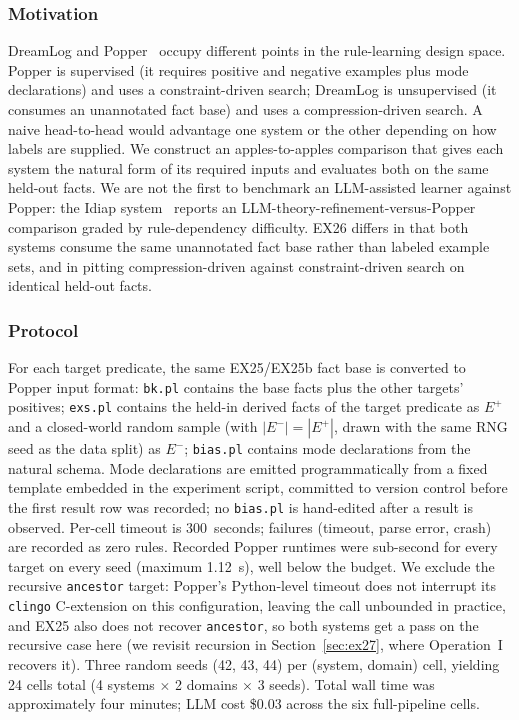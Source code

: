 \documentclass[10pt,conference]{IEEEtran}
\begin{document}
\subsubsection{Motivation}
DreamLog and Popper~\cite{cropper2021learning} occupy different points in the rule-learning design space. Popper is supervised (it requires positive and negative examples plus mode declarations) and uses a constraint-driven search; DreamLog is unsupervised (it consumes an unannotated fact base) and uses a compression-driven search. A naive head-to-head would advantage one system or the other depending on how labels are supplied. We construct an apples-to-apples comparison that gives each system the natural form of its required inputs and evaluates both on the same held-out facts. We are not the first to benchmark an LLM-assisted learner against Popper: the Idiap system~\cite{desouza2025inductive} reports an LLM-theory-refinement-versus-Popper comparison graded by rule-dependency difficulty. EX26 differs in that both systems consume the same unannotated fact base rather than labeled example sets, and in pitting compression-driven against constraint-driven search on identical held-out facts.

\subsubsection{Protocol}
For each target predicate, the same EX25/EX25b fact base is converted to Popper input format: \texttt{bk.pl} contains the base facts plus the other targets' positives; \texttt{exs.pl} contains the held-in derived facts of the target predicate as $E^+$ and a closed-world random sample (with $|E^-| = |E^+|$, drawn with the same RNG seed as the data split) as $E^-$; \texttt{bias.pl} contains mode declarations from the natural schema. Mode declarations are emitted programmatically from a fixed template embedded in the experiment script, committed to version control before the first result row was recorded; no \texttt{bias.pl} is hand-edited after a result is observed. Per-cell timeout is 300~seconds; failures (timeout, parse error, crash) are recorded as zero rules. Recorded Popper runtimes were sub-second for every target on every seed (maximum 1.12~s), well below the budget. We exclude the recursive \texttt{ancestor} target: Popper's Python-level timeout does not interrupt its \texttt{clingo} C-extension on this configuration, leaving the call unbounded in practice, and EX25 also does not recover \texttt{ancestor}, so both systems get a pass on the recursive case here (we revisit recursion in Section~\ref{sec:ex27}, where Operation~I recovers it). Three random seeds (42, 43, 44) per (system, domain) cell, yielding 24 cells total (4 systems $\times$ 2 domains $\times$ 3 seeds). Total wall time was approximately four minutes; LLM cost \$0.03 across the six full-pipeline cells.
\end{document}
